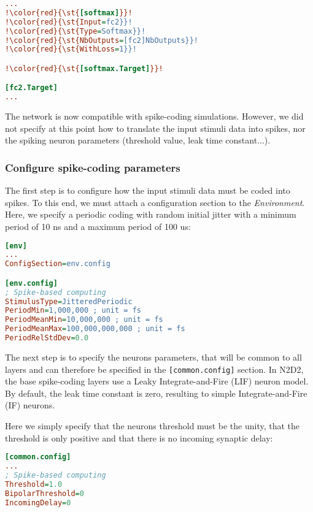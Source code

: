 \documentclass[a4paper,11pt,oneside]{article}
\begin{document}
\begin{lstlisting}[language=ini,escapechar=!]
...
!\color{red}{\st{[softmax]}}!
!\color{red}{\st{Input=fc2}}!
!\color{red}{\st{Type=Softmax}}!
!\color{red}{\st{NbOutputs=[fc2]NbOutputs}}!
!\color{red}{\st{WithLoss=1}}!

!\color{red}{\st{[softmax.Target]}}!

[fc2.Target]
...
\end{lstlisting}

The network is now compatible with spike-coding simulations. However, we did not
specify at this point how to translate the input stimuli data into spikes, nor
the spiking neuron parameters (threshold value, leak time constant...).

\subsubsection{Configure spike-coding parameters}

The first step is to configure how the input stimuli data must be coded into
spikes. To this end, we must attach a configuration section to the
\emph{Environment}. Here, we specify a periodic coding with random initial
jitter with a minimum period of 10 ns and a maximum period of 100 us:

\begin{lstlisting}[language=ini,escapechar=!]
[env]
...
ConfigSection=env.config

[env.config]
; Spike-based computing
StimulusType=JitteredPeriodic
PeriodMin=1,000,000 ; unit = fs
PeriodMeanMin=10,000,000 ; unit = fs
PeriodMeanMax=100,000,000,000 ; unit = fs
PeriodRelStdDev=0.0
\end{lstlisting}

The next step is to specify the neurons parameters, that will be common to all
layers and can therefore be specified in the \lstinline![common.config]!
section. In N2D2, the base spike-coding layers use a Leaky Integrate-and-Fire
(LIF) neuron model. By default, the leak time constant is zero, resulting
to simple Integrate-and-Fire (IF) neurons.

Here we simply specify that the neurons threshold must be the unity, that the
threshold is only positive and that there is no incoming synaptic delay:

\begin{lstlisting}[language=ini,escapechar=!]
[common.config]
...
; Spike-based computing
Threshold=1.0
BipolarThreshold=0
IncomingDelay=0
\end{lstlisting}
\end{document}
